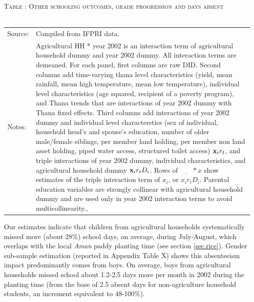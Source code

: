 \documentclass[12pt,letterpaper]{article}
\newcommand{\bfx}{\ensuremath{\mbox{\bf x}}}
\newcommand{\0}{\ensuremath{\mbox{\boldmath $0$}}}
\begin{document}
\begin{table}\hfil\textsc{\footnotesize Table \thetable: Other schooling outcomes, grade progression and days absent\label{NumGradesDaysAbsentResults}}\\\setlength{\tabcolsep}{.5pt}\renewcommand{\arraystretch}{.675}\hspace{-2em}\hfil\\\renewcommand{\arraystretch}{1}\hfil\begin{tabular}{>{\hfill\scriptsize}p{1cm}<{}>{\scriptsize}p{12cm}<{\hfill}} Source:& Compiled from IFPRI data. \\[-1ex] Notes:&   \textsf{Agricultural HH * year 2002} is an interaction term of agricultural household dummy and year 2002 dummy. All interaction terms are demeaned. For each panel, first columns are raw DID. Second columns add time-varying thana level characteristics (yield, mean rainfall, mean high temperature, mean low temperature), individual level characteristics (age squared, recipient of a poverty program), and \textsf{Thana trends} that are interactions of year 2002 dummy with Thana fixed effects. Third columns add interactions of year 2002 dummy and individual level characterstics (sex of individual, household head's and spouse's education, number of older male/female siblings, per member land holding, per member non land asset holding, piped water access, structured toilet access) $\bfx_{i}r_{t}$, and triple interactions of year 2002 dummy, individual characteristics, and agricultural household dummy $\bfx_{i}r_{t}D_{i}$. Rows of $\underline{\phantom{mm}}*x$ show estimates of the triple interaction term of $x_{i}$, or $x_{i}r_{t}D_{i}$. Parental education variables are strongly collinear with agricultural household dummy and are used only in year 2002 interaction terms to avoid multicollinearity., \\   \end{tabular} \end{table}

Our estimates indicate that children from agricultural households systematically missed more (about 28\%) school days, on average, during July-August, which overlaps with the local \textit{Aman} paddy planting time (see section \ref{sec.rice}). Gender sub-sample estimation (reported in Appendix Table X) shows this absenteeism impact predominantly comes from boys. On average, boys from agricultural households missed school about 1.2-2.5 days more per month in 2002 during the planting time (from the base of 2.5 absent days for non-agriculture household students, an increment equivalent to 48-100\%). 
\end{document}
